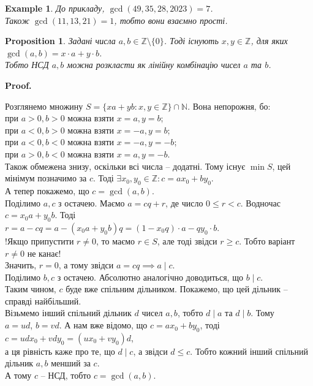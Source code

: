 \documentclass[a4paper, 14pt]{extarticle}
\makeatletter
\theoremstyle{theoremdd}
\theoremstyle{theoremdd}
\theoremstyle{theoremdd}
\theoremstyle{theoremdd}
\newtheorem{example}[theorem]{Example}
\theoremstyle{theoremdd}
\newtheorem{proposition}[theorem]{Proposition}
\theoremstyle{theoremdd}
\theoremstyle{theoremdd}
\theoremstyle{theoremdd}
\def\qed{$\blacksquare$}
\renewenvironment{proof}[1][Proof.\\]{\par
\pushQED{\hfill \qed}%
\normalfont \topsep6\p@\@plus6\p@\relax
\trivlist
\item\relax
{\bfseries
#1\@addpunct{.}}\hspace\labelsep\ignorespaces
}{%
\popQED\endtrivlist\@endpefalse
}
\makeatother
\begin{document}
\begin{example}
До прикладу, $\gcd(49,35,28,2023) = 7$.\\
Також $\gcd(11,13,21) = 1$, тобто вони взаємно прості.
\end{example}

\begin{proposition}
\label{gcd(a,b) = xa+yb}
Задані числа $a,b \in \mathbb{Z} \setminus \{0\}$. Тоді існують $x,y \in \mathbb{Z}$, для яких $\gcd(a,b) = x \cdot a + y \cdot b$.\\ Тобто НСД $a,b$ можна розкласти як лінійну комбінацію чисел $a$ та $b$.
\end{proposition}

\begin{proof}
Розглянемо множину $S = \{xa+yb: x,y \in \mathbb{Z}\} \cap \mathbb{N}$. Вона непорожня, бо: \\
при $a > 0, b > 0$ можна взяти $x = a, y = b$; \\
при $a <0, b >0$ можна взяти $x = -a, y = b$; \\
при $a <0, b<0$ можна взяти $x = -a, y = -b$;\\
при $a >0, b <0$ можна взяти $x = a, y = -b$. \\
Також обмежена знизу, оскільки всі числа -- додатні. Тому існує $\min S$, цей мінімум позначимо за $c$. Тоді $\exists x_0,y_0 \in \mathbb{Z}: c = ax_0 + by_0$.\\
А тепер покажемо, що $c = \gcd(a,b)$.\\
Поділимо $a,c$ з остачею. Маємо $a = cq + r$, де число $0 \leq r < c$. Водночас $c = x_0a+y_0b$. Тоді\\
$r = a - cq = a - (x_0a+y_0b)q = (1-x_0q)\cdot a - qy_0 \cdot b$.\\
!Якщо припустити $r \neq 0$, то маємо $r \in S$, але тоді звідси $r \geq c$. Тобто варіант $r \neq 0$ не канає!\\
Значить, $r = 0$, а тому звідси $a = cq \implies a \mid c$.\\
Поділимо $b,c$ з остачею. Абсолютно аналогічно доводиться, що $b \mid c$.\\
Таким чином, $c$ буде вже спільним дільником. Покажемо, що цей дільник -- справді найбільший.\\
Візьмемо інший спільний дільник $d$ чисел $a,b$, тобто $d \mid a$ та $d \mid b$. Тому \\ $a = ud$, $b = vd$. А нам вже відомо, що $c = ax_0 + by_0$, тоді\\
$c = udx_0 + vdy_0 = (ux_0 + vy_0)d$, \\
а ця рівність каже про те, що $d \mid c$, а звідси $d \leq c$. Тобто кожний інший спільний дільник $a,b$ менший за $c$.\\
А тому $c$ -- НСД, тобто $c = \gcd(a,b)$.
\end{proof}
\end{document}
